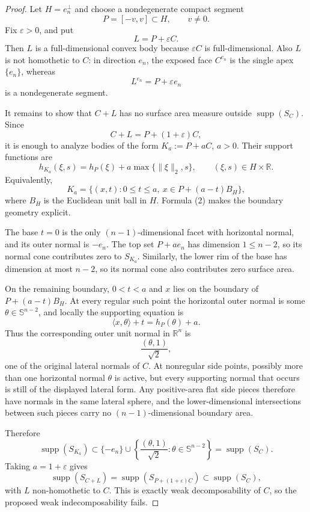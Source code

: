 \documentclass[11pt]{amsart}
\theoremstyle{remark}
\newcommand{\R}{\mathbb R}
\newcommand{\Sph}{\mathbb S}
\newcommand{\supp}{\operatorname{supp}}
\newcommand{\eps}{\varepsilon}
\begin{document}
\begin{proof}
Let \(H=e_n^\perp\) and choose a nondegenerate compact segment
\[
        P=[-v,v]\subset H,\qquad v\neq 0.
\]
Fix \(\eps>0\), and put
\[
        L=P+\eps C.
\]
Then \(L\) is a full-dimensional convex body because \(\eps C\) is
full-dimensional. Also \(L\) is not homothetic to \(C\): in direction \(e_n\),
the exposed face \(C^{e_n}\) is the single apex \(\{e_n\}\), whereas
\[
        L^{e_n}=P+\eps e_n
\]
is a nondegenerate segment.

It remains to show that \(C+L\) has no surface area measure outside
\(\supp(S_C)\). Since
\[
        C+L=P+(1+\eps)C,
\]
it is enough to analyze bodies of the form \(K_a:=P+aC\), \(a>0\). Their
support functions are
\[
        h_{K_a}(\xi,s)=h_P(\xi)+a\max\{\|\xi\|_2,s\},
        \qquad (\xi,s)\in H\times\R.              \tag{1}
\]
Equivalently,
\[
        K_a=\{(x,t):0\leq t\leq a,\ x\in P+(a-t)B_H\},       \tag{2}
\]
where \(B_H\) is the Euclidean unit ball in \(H\). Formula (2) makes the
boundary geometry explicit.

The base \(t=0\) is the only \((n-1)\)-dimensional facet with horizontal
normal, and its outer normal is \(-e_n\). The top set \(P+ae_n\) has dimension
\(1\leq n-2\), so its normal cone contributes zero to \(S_{K_a}\). Similarly,
the lower rim of the base has dimension at most \(n-2\), so its normal cone
also contributes zero surface area.

On the remaining boundary, \(0<t<a\) and \(x\) lies on the boundary of
\(P+(a-t)B_H\). At every regular such point the horizontal outer normal is
some \(\theta\in\Sph^{n-2}\), and locally the supporting equation is
\[
        \langle x,\theta\rangle+t=h_P(\theta)+a.
\]
Thus the corresponding outer unit normal in \(\R^n\) is
\[
        \frac{(\theta,1)}{\sqrt2},
\]
one of the original lateral normals of \(C\). At nonregular side points,
possibly more than one horizontal normal \(\theta\) is active, but every
supporting normal that occurs is still of the displayed lateral form. Any
positive-area flat side pieces therefore have normals in the same lateral
sphere, and the lower-dimensional intersections between such pieces carry no
\((n-1)\)-dimensional boundary area.

Therefore
\[
        \supp(S_{K_a})\subset
        \{-e_n\}\cup\left\{\frac{(\theta,1)}{\sqrt2}:
        \theta\in\Sph^{n-2}\right\}=\supp(S_C).
\]
Taking \(a=1+\eps\) gives
\[
        \supp(S_{C+L})=\supp(S_{P+(1+\eps)C})\subset\supp(S_C),
\]
with \(L\) non-homothetic to \(C\). This is exactly weak decomposability of
\(C\), so the proposed weak indecomposability fails.
\end{proof}
\end{document}
